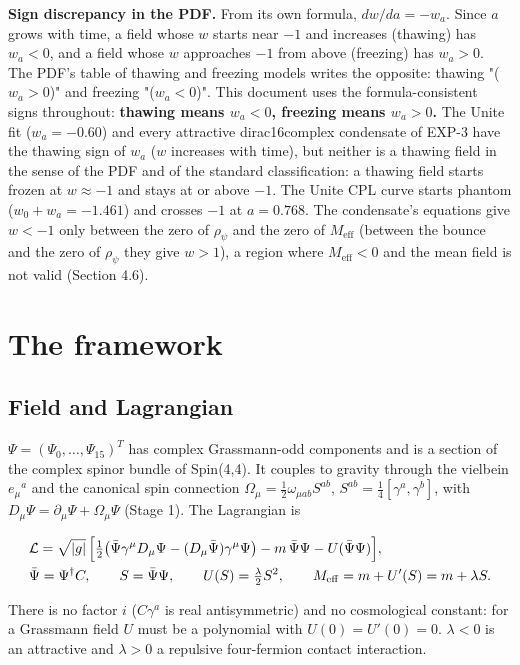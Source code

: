 \documentclass[11pt]{article}
\begin{document}
\textbf{Sign discrepancy in the PDF.} From its own formula, $dw/da=-w_a$. Since $a$ grows with time, a field whose $w$ starts near $-1$ and increases (thawing) has $w_a<0$, and a field whose $w$ approaches $-1$ from above (freezing) has $w_a>0$. The PDF's table of thawing and freezing models writes the opposite: thawing "($w_a>0$)" and freezing "($w_a<0$)". This document uses the formula-consistent signs throughout: \textbf{thawing means $w_a<0$, freezing means $w_a>0$.} The Unite fit ($w_a=-0.60$) and every attractive dirac16complex condensate of EXP-3 have the thawing sign of $w_a$ ($w$ increases with time), but neither is a thawing field in the sense of the PDF and of the standard classification: a thawing field starts frozen at $w\approx-1$ and stays at or above $-1$. The Unite CPL curve starts phantom ($w_0+w_a=-1.461$) and crosses $-1$ at $a=0.768$. The condensate's equations give $w<-1$ only between the zero of $\rho_\psi$ and the zero of $M_{\mathrm{eff}}$ (between the bounce and the zero of $\rho_\psi$ they give $w>1$), a region where $M_{\mathrm{eff}}<0$ and the mean field is not valid (Section 4.6).

\section{The framework}

\subsection{Field and Lagrangian}

$\Psi=(\Psi_0,\dots,\Psi_{15})^T$ has complex Grassmann-odd components and is a section of the complex spinor bundle of Spin(4,4). It couples to gravity through the vielbein $e_\mu{}^a$ and the canonical spin connection $\Omega_\mu=\tfrac12\omega_{\mu ab}S^{ab}$, $S^{ab}=\tfrac14[\gamma^a,\gamma^b]$, with $D_\mu\Psi=\partial_\mu\Psi+\Omega_\mu\Psi$ (Stage 1). The Lagrangian is

\[
\begin{aligned}
&\mathcal L=\sqrt{|g|}\,\Bigl[\tfrac12\bigl(\bar\Psi\gamma^\mu D_\mu\Psi-(D_\mu\bar\Psi)\gamma^\mu\Psi\bigr)-m\,\bar\Psi\Psi-U(\bar\Psi\Psi)\Bigr],\\
&\bar\Psi=\Psi^\dagger C,\qquad S=\bar\Psi\Psi,\qquad U(S)=\tfrac\lambda2S^2,\qquad M_{\mathrm{eff}}=m+U'(S)=m+\lambda S .
\end{aligned}
\]

There is no factor $i$ ($C\gamma^a$ is real antisymmetric) and no cosmological constant: for a Grassmann field $U$ must be a polynomial with $U(0)=U'(0)=0$. $\lambda<0$ is an attractive and $\lambda>0$ a repulsive four-fermion contact interaction.
\end{document}
